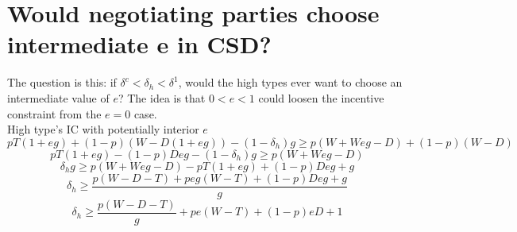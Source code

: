 \documentclass[12pt]{article}
\newcommand{\de}{\delta}
\begin{document}
\section{Would negotiating parties choose intermediate e in CSD?}

The question is this: if $\de^c < \de_h < \de^1$, would the high types ever want to choose an intermediate value of $e$? The idea is that $0<e<1$ could loosen the incentive constraint from the $e=0$ case.\\

High type's IC with potentially interior $e$
$$pT(1+eg) + (1-p)(W-D(1+eg)) - (1-\de_h)g \geq p(W+Weg-D) + (1-p)(W-D)$$
$$pT(1+eg) - (1-p)Deg - (1-\de_h)g \geq p(W+Weg-D)$$
$$\de_h g \geq p(W+Weg-D) - pT(1+eg) + (1-p)Deg + g$$
$$\de_h \geq \frac{p(W-D-T) + peg (W-T) + (1-p)Deg + g }{g}$$
$$\de_h \geq \frac{p(W-D-T)}{g} + p e(W-T) + (1-p)eD + 1$$
\end{document}
